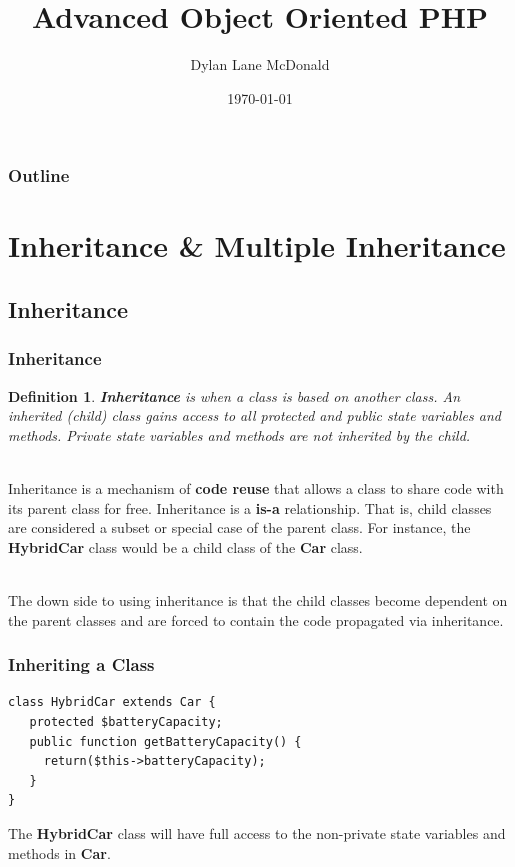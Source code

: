 \documentclass[aspectratio=169]{beamer}
\title{Advanced Object Oriented PHP}
\author{Dylan Lane McDonald}
\institute{CNM STEMulus Center\\Web Development with PHP}
\date{\today}
\newtheorem{defn}{Definition}
\begin{document}
\lstset{language=Java}
\begin{frame}
\titlepage
\end{frame}

\begin{frame}
\frametitle{Outline}
\tableofcontents
\end{frame}

\section{Inheritance \& Multiple Inheritance}
\subsection{Inheritance}
\begin{frame}
\frametitle{Inheritance}
\begin{defn}
\textbf{Inheritance} is when a class is based on another class. An inherited (child) class gains access to all protected and public state variables and methods. Private state variables and methods are not inherited by the child.
\end{defn}

\pause
\mbox{}\\
Inheritance is a mechanism of \textbf{code reuse} that allows a class to share code with its parent class for free. Inheritance is a \textbf{is-a} relationship. That is, child classes are considered a subset or special case of the parent class. For instance, the \textbf{HybridCar} class would be a child class of the \textbf{Car} class.

\mbox{}\\
The down side to using inheritance is that the child classes become dependent on the parent classes and are forced to contain the code propagated via inheritance.
\end{frame}

\begin{frame}[fragile]
\frametitle{Inheriting a Class}
\begin{lstlisting}[caption=Creating a Hybrid from a Car]
class HybridCar extends Car {
   protected $batteryCapacity;
   public function getBatteryCapacity() {
     return($this->batteryCapacity);
   }
}
\end{lstlisting}

The \textbf{HybridCar} class will have full access to the non-private state variables and methods in \textbf{Car}.
\end{frame}
\end{document}

